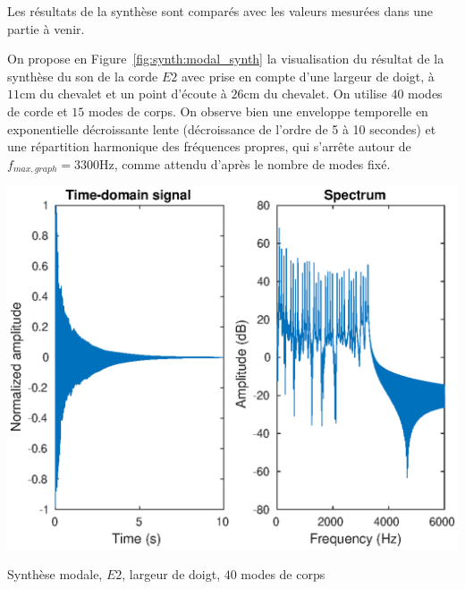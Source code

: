 Les résultats de la synthèse sont comparés avec les valeurs mesurées dans une
partie à venir.

On propose en Figure~\ref{fig:synth:modal_synth} la visualisation du résultat
de la synthèse du son de la corde \( E2 \) avec prise en compte d'une largeur
de doigt, à \( \si{11\cm} \) du chevalet et un point d'écoute à
\( \si{26\cm} \) du chevalet.
On utilise \( 40 \) modes de corde et \( 15 \) modes de corps.
On observe bien une enveloppe temporelle en exponentielle décroissante lente
(décroissance de l'ordre de 5 à 10 secondes) et une répartition harmonique
des fréquences propres, qui s'arrête autour de
\( f_{max, graph} = \si{3300\Hz} \), comme attendu d'après le nombre de modes
fixé.

\begin{table}[hpbt]
\centering
\includegraphics[scale=0.8]{figures/modal_synthesis-E2-40_string_modes-15_body_modes-finger_pluck.eps}
 \caption{Synthèse modale, \( E2 \), largeur de doigt, \( 40 \) modes de corps
 \label{fig:synth:modal_synth}}
\end{table}

% 
